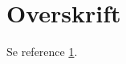 \documentclass{article}
\begin{document}
\section{Overskrift}
\label{secOverskrift}

Se reference \ref{secOverskrift}.
\end{document}
